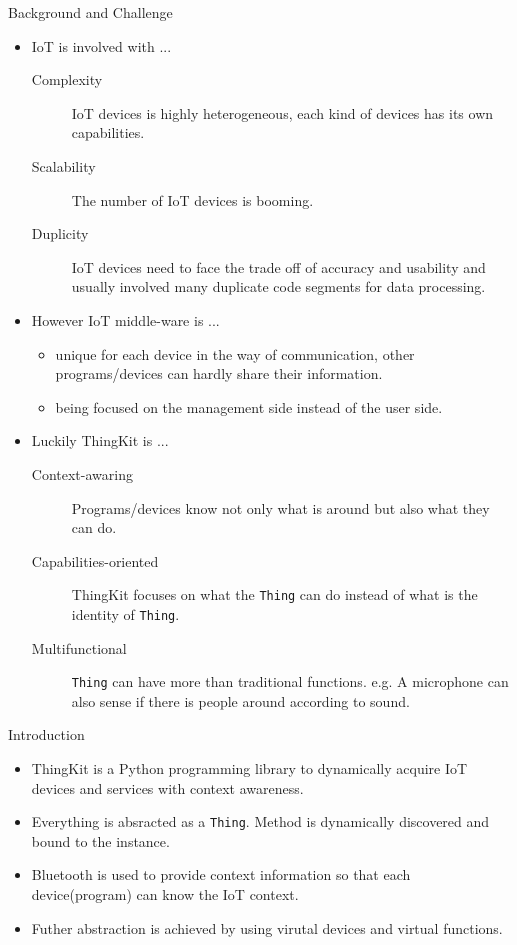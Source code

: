 \documentclass[a0paper,portrait]{baposter}
\begin{document}
\begin{poster}
\begin{posterbox}[name=back,column=0,span=2,row=0]{Background and Challenge}
\begin{itemize}
  \item IoT is involved with ...
    \begin{description}
      \item[Complexity] IoT devices is highly heterogeneous, each kind of devices has its own capabilities.
      \item[Scalability] The number of IoT devices is booming.
      \item[Duplicity] IoT devices need to face the trade off of accuracy and usability and usually involved many duplicate code segments for data processing.
    \end{description}
  \item However IoT middle-ware is ...
    \begin{itemize}
      \item unique for each device in the way of communication, other programs/devices can hardly share their information.
      \item being focused on the management side instead of the user side.
    \end{itemize}
  \item Luckily ThingKit is ...
    \begin{description}
      \item[Context-awaring] Programs/devices know not only what is around but also what they can do.
      \item[Capabilities-oriented] ThingKit focuses on what the \texttt{Thing} can do instead of what is the identity of \texttt{Thing}.
      \item[Multifunctional] \texttt{Thing} can have more than traditional functions. e.g. A microphone can also sense if there is people around according to sound.
    \end{description}
\end{itemize}
\end{posterbox}

\begin{posterbox}[name=intro,column=0,below=back,span=2]{Introduction}
\begin{itemize}
  \item ThingKit is a Python programming library to dynamically acquire IoT devices and services with context awareness.
  \item Everything is absracted as a \texttt{Thing}. Method is dynamically discovered and bound to the instance.
  \item Bluetooth is used to provide context information so that each device(program) can know the IoT context.
  \item Futher abstraction is achieved by using virutal devices and virtual functions.
\end{itemize}
\end{posterbox}


\end{poster}
\end{document}
